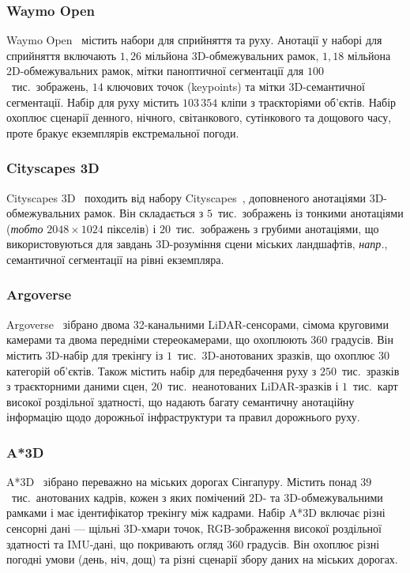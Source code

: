 \subsubsection{Waymo Open}
Waymo Open~\cite{sun2020waymo} містить набори для сприйняття та руху.
Анотації у наборі для сприйняття включають $1{,}26$ мільйона 3D-обмежувальних рамок, $1{,}18$ мільйона 2D-обмежувальних рамок, мітки паноптичної сегментації для $100$~тис.\ зображень, $14$ ключових точок (keypoints) та мітки 3D-семантичної сегментації.
Набір для руху містить $103\,354$ кліпи з траєкторіями об'єктів.
Набір охоплює сценарії денного, нічного, світанкового, сутінкового та дощового часу, проте бракує екземплярів екстремальної погоди.

\subsubsection{Cityscapes 3D}
Cityscapes 3D~\cite{Gahlert2020Cityscapes3D} походить від набору Cityscapes~\cite{Cordts2016Cityscapes}, доповненого анотаціями 3D-обмежувальних рамок.
Він складається з $5$~тис.\ зображень із тонкими анотаціями (\textit{тобто} $2048\times 1024$ пікселів) і $20$~тис.\ зображень з грубими анотаціями, що використовуються для завдань 3D-розуміння сцени міських ландшафтів, \textit{напр.}, семантичної сегментації на рівні екземпляра.

\subsubsection{Argoverse}
Argoverse~\cite{chang2019argoverse} зібрано двома 32-канальними LiDAR-сенсорами, сімома круговими камерами та двома передніми стереокамерами, що охоплюють 360 градусів.
Він містить 3D-набір для трекінгу із $1$~тис.\ 3D-анотованих зразків, що охоплює $30$ категорій об'єктів.
Також містить набір для передбачення руху з $250$~тис.\ зразків з траєкторними даними сцен, $20$~тис.\ неанотованих LiDAR-зразків і $1$~тис.\ карт високої роздільної здатності, що надають багату семантичну анотаційну інформацію щодо дорожньої інфраструктури та правил дорожнього руху.

\subsubsection{A*3D}
A*3D~\cite{pham2020a3d} зібрано переважно на міських дорогах Сінгапуру. Містить понад $39$~тис.\ анотованих кадрів, кожен з яких помічений 2D- та 3D-обмежувальними рамками і має ідентифікатор трекінгу між кадрами. Набір A*3D включає різні сенсорні дані — щільні 3D-хмари точок, RGB-зображення високої роздільної здатності та IMU-дані, що покривають огляд 360 градусів. Він охоплює різні погодні умови (день, ніч, дощ) та різні сценарії збору даних на міських дорогах.


